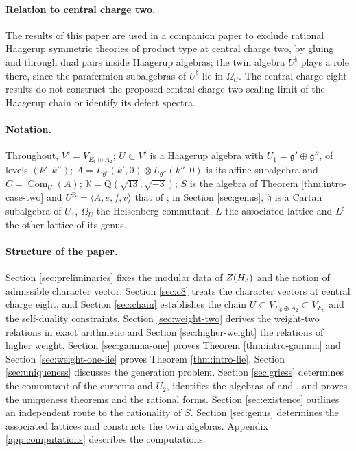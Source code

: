 \documentclass[leqno]{article}
\newcommand{\K}{\ensuremath{\mathbb{K}}}
\newcommand{\Q}{\mathrm{Q}}
\let\cal\relax
\newcommand{\cal}{\mathcal}
\newcommand{\la}{\langle}
\newcommand{\ra}{\rangle}
\newcommand{\ot}{\otimes}
\numberwithin{equation}{section}
\begin{document}
\paragraph{Relation to central charge two.} The results of this paper are used in a companion paper \cite{ArhII} to exclude rational Haagerup symmetric theories of product type at central charge two, by gluing and through dual pairs inside Haagerup algebras; the twin algebra $U^\natural$ plays a role there, since the parafermion subalgebras of $U^\natural$ lie in $\Omega_U$. The central-charge-eight results do not construct the proposed central-charge-two scaling limit of the Haagerup chain or identify its defect spectra.

\paragraph{Notation.} Throughout, $V' = V_{E_6 \oplus A_2}$; $U \subset V'$ is a Haagerup algebra with $U_1 = \mathfrak g' \oplus \mathfrak g''$, of levels $(k',k'')$; $A = L_{\mathfrak g'}(k',0) \ot L_{\mathfrak g''}(k'',0)$ is its affine subalgebra and $C = \operatorname{Com}_U(A)$; $\K = \Q(\sqrt{13},\sqrt{-3})$; $S$ is the algebra of Theorem \ref{thm:intro-case-two} and $U^{\mathrm R} = \la A,e,f,v\ra$ that of \cite{Rie26}; in Section \ref{sec:genus}, $\mathfrak h$ is a Cartan subalgebra of $U_1$, $\Omega_U$ the Heisenberg commutant, $L$ the associated lattice and $L^\natural$ the other lattice of its genus.

\paragraph{Structure of the paper.} Section \ref{sec:preliminaries} fixes the modular data of $Z(\cal H_3)$ and the notion of admissible character vector. Section \ref{sec:c8} treats the character vectors at central charge eight, and Section \ref{sec:chain} establishes the chain $U \subset V_{E_6 \oplus A_2} \subset V_{E_8}$ and the self-duality constraints. Section \ref{sec:weight-two} derives the weight-two relations in exact arithmetic and Section \ref{sec:higher-weight} the relations of higher weight. Section \ref{sec:gamma-one} proves Theorem \ref{thm:intro-gamma} and Section \ref{sec:weight-one-lie} proves Theorem \ref{thm:intro-lie}. Section \ref{sec:uniqueness} discusses the generation problem. Section \ref{sec:griess} determines the commutant of the currents and $U_2$, identifies the algebras of \cite{Jia26} and \cite{Rie26}, and proves the uniqueness theorems and the rational forms. Section \ref{sec:existence} outlines an independent route to the rationality of $S$. Section \ref{sec:genus} determines the associated lattices and constructs the twin algebras. Appendix \ref{app:computations} describes the computations.
\end{document}
